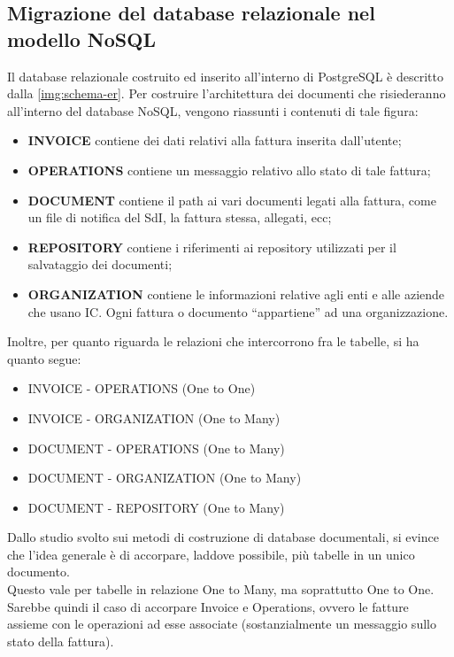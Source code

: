 \subsection{Migrazione del database relazionale nel modello NoSQL}
Il database relazionale costruito ed inserito all'interno di PostgreSQL è descritto dalla \autoref{img:schema-er}. Per costruire l'architettura dei documenti che risiederanno all'interno del database NoSQL, vengono riassunti i contenuti di tale figura:\\
\begin{itemize}
    \item \textbf{INVOICE} contiene dei dati relativi alla fattura inserita dall'utente;
    \item \textbf{OPERATIONS} contiene un messaggio relativo allo stato di tale fattura;
    \item \textbf{DOCUMENT} contiene il path ai vari documenti legati alla fattura, come un file di notifica del SdI, la fattura stessa, allegati, ecc;
    \item \textbf{REPOSITORY} contiene i riferimenti ai repository utilizzati per il salvataggio dei documenti;
    \item \textbf{ORGANIZATION} contiene le informazioni relative agli enti e alle aziende che usano IC. Ogni fattura o documento ``appartiene'' ad una organizzazione.
\end{itemize}

\noindent Inoltre, per quanto riguarda le relazioni che intercorrono fra le tabelle, si ha quanto segue:
\begin{itemize}
    \item INVOICE - OPERATIONS (One to One)
    \item INVOICE - ORGANIZATION (One to Many)
    \item DOCUMENT - OPERATIONS (One to Many)
    \item DOCUMENT - ORGANIZATION (One to Many)
    \item DOCUMENT - REPOSITORY (One to Many)
\end{itemize}

\noindent Dallo studio svolto sui metodi di costruzione di database documentali, si evince che l'idea generale è di accorpare, laddove possibile, più tabelle in un unico documento.\\
Questo vale per tabelle in relazione One to Many, ma soprattutto One to One.\\
Sarebbe quindi il caso di accorpare Invoice e Operations, ovvero le fatture assieme con le operazioni ad esse associate (sostanzialmente un messaggio sullo stato della fattura).\\


